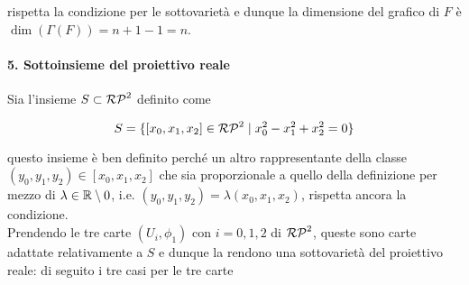 rispetta la condizione per le sottovarietà e dunque la dimensione del grafico di $ F $ è $ \dim(\Gamma(F)) = n+1-1 = n $.

\paragraph{5. Sottoinsieme del proiettivo reale}

Sia l'insieme $ S \subset \mathcal{RP}^{2} $ definito come

\begin{equation}
	S = \{ [x_{0},x_{1},x_{2}] \in \mathcal{RP}^{2} \mid x_{0}^{2} - x_{1}^{2} + x_{2}^{2} = 0 \}
\end{equation}

questo insieme è ben definito perché un altro rappresentante della classe $ (y_{0},y_{1},y_{2}) \in [x_{0},x_{1},x_{2}] $ che sia proporzionale a quello della definizione per mezzo di $ \lambda \in \mathbb{R} \setminus 0 $, i.e. $ (y_{0},y_{1},y_{2}) = \lambda (x_{0},x_{1},x_{2}) $, rispetta ancora la condizione.\\
Prendendo le tre carte $ (U_{i},\phi_{1}) $ con $ i=0,1,2 $ di $ \mathcal{RP}^{2} $, queste sono carte adattate relativamente a $ S $ e dunque la rendono una sottovarietà del proiettivo reale: di seguito i tre casi per le tre carte

